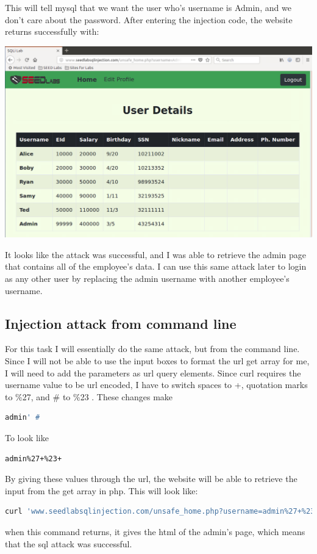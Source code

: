 \documentclass[14pt]{extarticle}
\begin{document}
This will tell mysql that we want the user who's username is Admin, and we don't care about the password. After entering the injection code, the website returns successfully with:\\
\begin{center}
\includegraphics[width=\linewidth]{unsafe_home-admin}\\
\end{center}
It looks like the attack was successful, and I was able to retrieve the admin page that contains all of the employee's data. I can use this same attack later to login as any other user by replacing the admin username with another employee's username.

\subsection{Injection attack from command line}

For this task I will essentially do the same attack, but from the command line. Since I will not be able to use the input boxes to format the url get array for me, I will need to add the parameters as url query elements.
Since curl requires the username value to be url encoded, I have to switch spaces to +, quotation marks to \%27, and \# to \%23 \cite{seed-sqlatk}.
These changes make
\begin{lstlisting}[language=sh]
admin' #
\end{lstlisting}
To look like
\begin{lstlisting}[language=sh]
admin%27+%23+
\end{lstlisting}
By giving these values through the url, the website will be able to retrieve the input from the get array in php. This will look like:
\begin{lstlisting}[language=sh]
curl 'www.seedlabsqlinjection.com/unsafe_home.php?username=admin%27+%23+&Password='
\end{lstlisting}
when this command returns, it gives the html of the admin's page, which means that the sql attack was successful.
\end{document}
